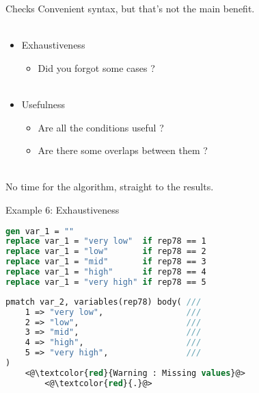 \documentclass[11pt]{beamer}
\begin{document}
\begin{frame}{Checks}
Convenient syntax, but that’s not the main benefit. \\~
\begin{itemize}
    \item Exhaustiveness
    \begin{itemize}
        \item Did you forgot some cases ? \\~
    \end{itemize}
    \item Usefulness
    \begin{itemize}
        \item Are all the conditions useful ?
        \item Are there some overlaps between them ? \\~
    \end{itemize}
\end{itemize}

No time for the algorithm, straight to the results.
\end{frame}

\begin{frame}[fragile]{Example 6: Exhaustiveness}
\label{example_6}

\footnotesize
\begin{lstlisting}[language=Stata]
gen var_1 = ""
replace var_1 = "very low"  if rep78 == 1
replace var_1 = "low"       if rep78 == 2
replace var_1 = "mid"       if rep78 == 3
replace var_1 = "high"      if rep78 == 4
replace var_1 = "very high" if rep78 == 5
\end{lstlisting}

\begin{lstlisting}[language=Stata]
pmatch var_2, variables(rep78) body( ///
    1 => "very low",                 ///
    2 => "low",                      ///
    3 => "mid",                      ///
    4 => "high",                     ///
    5 => "very high",                ///
)
    <@\textcolor{red}{Warning : Missing values}@>
        <@\textcolor{red}{.}@>
\end{lstlisting}

\end{frame}
\end{document}
